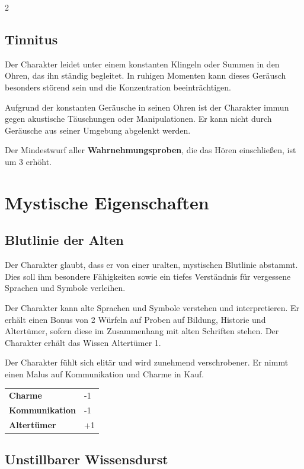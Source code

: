 \begin{multicols}{2}
    \subsection*{Tinnitus}

    Der Charakter leidet unter einem konstanten Klingeln oder Summen in den Ohren, das ihn ständig begleitet. In ruhigen Momenten kann dieses Geräusch besonders störend sein und die Konzentration beeinträchtigen.

    Aufgrund der konstanten Geräusche in seinen Ohren ist der Charakter immun gegen akustische Täuschungen oder Manipulationen. Er kann nicht durch Geräusche aus seiner Umgebung abgelenkt werden.

    Der Mindestwurf aller \textbf{Wahrnehmungsproben}, die das Hören einschließen, ist um 3 erhöht.


    \section{Mystische Eigenschaften}

    \subsection*{Blutlinie der Alten}

    Der Charakter glaubt, dass er von einer uralten, mystischen Blutlinie abstammt. Dies soll ihm besondere Fähigkeiten sowie ein tiefes Verständnis für vergessene Sprachen und Symbole verleihen.

    Der Charakter kann alte Sprachen und Symbole verstehen und interpretieren. Er erhält einen Bonus von 2 Würfeln auf Proben auf Bildung, Historie und Altertümer, sofern diese im Zusammenhang mit alten Schriften stehen. Der Charakter erhält das Wissen Altertümer 1.

    Der Charakter fühlt sich elitär und wird zunehmend verschrobener. Er nimmt einen Malus auf Kommunikation und Charme in Kauf.

    \begin{tabular}{@{}ll@{}}
        \textbf{Charme} & -1\\
        \textbf{Kommunikation} & -1\\
        \textbf{Altertümer} & +1\\
    \end{tabular}

    \subsection*{Unstillbarer Wissensdurst}


\end{multicols}
